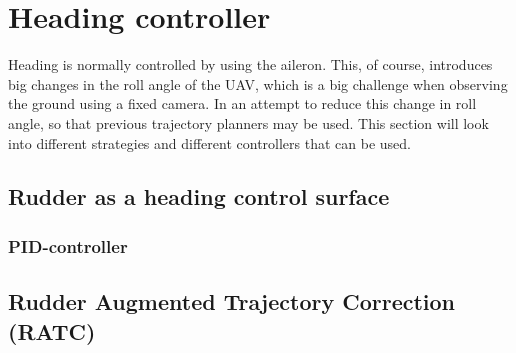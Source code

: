 \documentclass{article}
\begin{document}
\section{Heading controller}
Heading is normally controlled by using the aileron. This, of course, introduces big changes in the roll angle of the UAV, which is a big challenge when observing the ground using a fixed camera. In an attempt to reduce this change in roll angle, so that previous trajectory planners may be used. This section will look into different strategies and different controllers that can be used.

\subsection{Rudder as a heading control surface}

\subsubsection{PID-controller}


\subsection{Rudder Augmented Trajectory Correction (RATC)}
\end{document}
